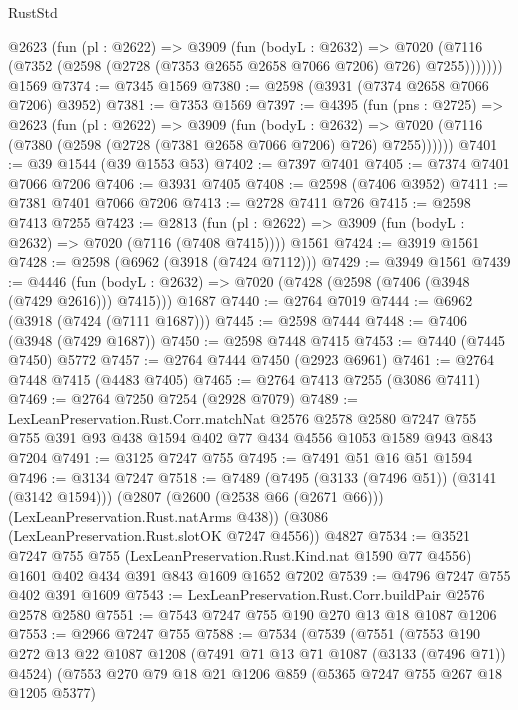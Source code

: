 \begin{lexlean}{RustStd}
\begin{coremodule}
      @2623
        (fun (pl : @2622) =>
        @3909
          (fun (bodyL : @2632) =>
          @7020 (@7116 (@7352 (@2598 (@2728 (@7353 @2655 @2658 @7066 @7206) @726) @7255)))))))
    @1569
@7374 := @7345 @1569
@7380 := @2598 (@3931 (@7374 @2658 @7066 @7206) @3952)
@7381 := @7353 @1569
@7397 := @4395
    (fun (pns : @2725) =>
    @2623
      (fun (pl : @2622) =>
      @3909
        (fun (bodyL : @2632) =>
        @7020 (@7116 (@7380 (@2598 (@2728 (@7381 @2658 @7066 @7206) @726) @7255))))))
@7401 := @39 @1544 (@39 @1553 @53)
@7402 := @7397 @7401
@7405 := @7374 @7401 @7066 @7206
@7406 := @3931 @7405
@7408 := @2598 (@7406 @3952)
@7411 := @7381 @7401 @7066 @7206
@7413 := @2728 @7411 @726
@7415 := @2598 @7413 @7255
@7423 := @2813
    (fun (pl : @2622) => @3909 (fun (bodyL : @2632) => @7020 (@7116 (@7408 @7415))))
    @1561
@7424 := @3919 @1561
@7428 := @2598 (@6962 (@3918 (@7424 @7112)))
@7429 := @3949 @1561
@7439 := @4446
    (fun (bodyL : @2632) => @7020 (@7428 (@2598 (@7406 (@3948 (@7429 @2616))) @7415)))
    @1687
@7440 := @2764 @7019
@7444 := @6962 (@3918 (@7424 (@7111 @1687)))
@7445 := @2598 @7444
@7448 := @7406 (@3948 (@7429 @1687))
@7450 := @2598 @7448 @7415
@7453 := @7440 (@7445 @7450) @5772
@7457 := @2764 @7444 @7450 (@2923 @6961)
@7461 := @2764 @7448 @7415 (@4483 @7405)
@7465 := @2764 @7413 @7255 (@3086 @7411)
@7469 := @2764 @7250 @7254 (@2928 @7079)
@7489 := LexLeanPreservation.Rust.Corr.matchNat
    @2576
    @2578
    @2580
    @7247
    @755
    @755
    @391
    @93
    @438
    @1594
    @402
    @77
    @434
    @4556
    @1053
    @1589
    @943
    @843
    @7204
@7491 := @3125 @7247 @755
@7495 := @7491 @51 @16 @51 @1594
@7496 := @3134 @7247
@7518 := @7489
    (@7495 (@3133 (@7496 @51)) (@3141 (@3142 @1594)))
    (@2807 (@2600 (@2538 @66 (@2671 @66))) (LexLeanPreservation.Rust.natArms @438))
    (@3086 (LexLeanPreservation.Rust.slotOK @7247 @4556))
    @4827
@7534 := @3521
    @7247
    @755
    @755
    (LexLeanPreservation.Rust.Kind.nat @1590 @77 @4556)
    @1601
    @402
    @434
    @391
    @843
    @1609
    @1652
    @7202
@7539 := @4796 @7247 @755 @402 @391 @1609
@7543 := LexLeanPreservation.Rust.Corr.buildPair @2576 @2578 @2580
@7551 := @7543 @7247 @755 @190 @270 @13 @18 @1087 @1206
@7553 := @2966 @7247 @755
@7588 := @7534
    (@7539
      (@7551
        (@7553
          @190
          @272
          @13
          @22
          @1087
          @1208
          (@7491 @71 @13 @71 @1087 (@3133 (@7496 @71)) @4524)
          (@7553
            @270
            @79
            @18
            @21
            @1206
            @859
            (@5365 @7247 @755 @267 @18 @1205 @5377)

\end{coremodule}
\end{lexlean}
